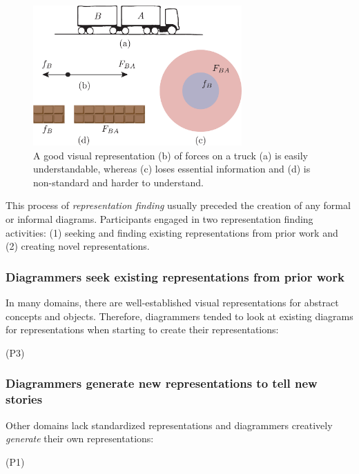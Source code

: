 \begin{figure}
    \centering
    \includegraphics[width=8cm]{assets/interviews/larkin-simon-labeled.pdf}
    \caption{A good visual representation (b) of forces on a truck (a) is easily understandable, whereas (c) loses essential information and (d) is non-standard and harder to understand.}
    \label{fig:forcediagram}
\end{figure}

This process of \textit{representation finding} usually preceded the creation of any formal or informal diagrams. Participants engaged in two representation finding activities: (1) seeking and finding existing representations from prior work and (2) creating novel representations. 

\subsubsection{Diagrammers seek existing representations from prior work}
In many domains, there are well-established visual representations for abstract concepts and objects. Therefore, diagrammers tended to look at existing diagrams for  representations when starting to create their representations:

 (P3)

\subsubsection{Diagrammers generate new representations to tell new stories} 
Other domains lack standardized representations and diagrammers creatively \textit{generate} their own representations:

     (P1)

